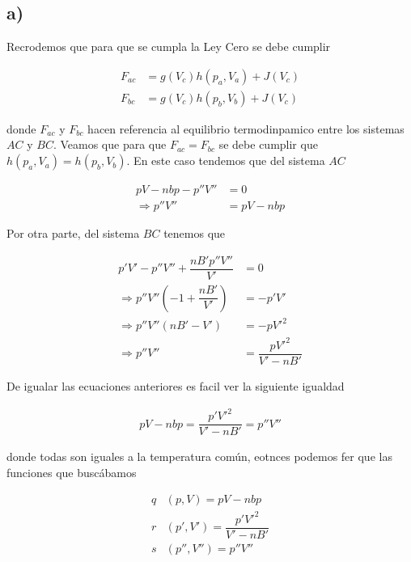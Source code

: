 \documentclass{article}
\newcommand{\pr}[1]{\left(#1\right)}
\begin{document}
\begin{tcolorbox}[breakable]
    \subsection*{a)} Recrodemos que para que se cumpla la Ley Cero se debe cumplir 
    
    \begin{align*}
        F_{ac}&=g\pr{V_c}h\pr{p_a,V_a}+J\pr{V_c}\\
        F_{bc}&=g\pr{V_c}h\pr{p_b,V_b}+J\pr{V_c}
    \end{align*}
    
    donde $F_{ac}$ y $F_{bc}$ hacen referencia al equilibrio termodinpamico entre los sistemas $AC$ y $BC$. Veamos que para que $F_{ac}=F_{bc}$ se debe cumplir que $h\pr{p_a,V_a}=h\pr{p_b,V_b}$. En este caso tendemos que del sistema $AC$
    
    \begin{align*}
        pV-nbp-p''V''&=0\\
        \Rightarrow p''V''&=pV-nbp
    \end{align*}
    
    Por otra parte, del sistema $BC$ tenemos que
    
    \begin{align*}
        p'V'-p''V''+\dfrac{nB'p''V''}{V'}&=0\\
        \Rightarrow p''V''\pr{-1+\dfrac{nB'}{V'}}&=-p'V'\\
        \Rightarrow p''V''\pr{nB'-V'}&=-pV'^2\\
        \Rightarrow p''V''&=\dfrac{pV'^2}{V'-nB'}
    \end{align*}
    
    De igualar las ecuaciones anteriores es facil ver la siguiente igualdad
    
    \begin{align*}
        pV-nbp=\dfrac{p'V'^2}{V'-nB'}=p''V''
    \end{align*}
    
    donde todas son iguales a la temperatura común, eotnces podemos fer que las funciones que buscábamos
    
    \begin{align*}
        q&\pr{p,V}=pV-nbp\\
        r&\pr{p',V'}=\dfrac{p'V'^2}{V'-nB'}\\
        s&\pr{p'',V''}=p''V''
    \end{align*}
    

\end{tcolorbox}
\end{document}
